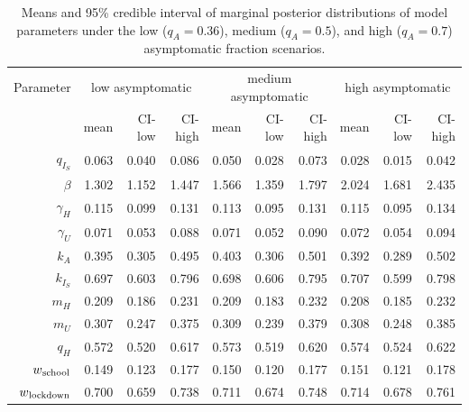 \documentclass[11pt]{article}
\begin{document}
\begin{table}[!htb]
	\centering
	\caption{Means and 95\% credible interval of marginal posterior distributions of model parameters under the low ($q_A = 0.36$), medium ($q_A = 0.5$), and high ($q_A = 0.7$) asymptomatic fraction scenarios.}
	\begin{tabular}{rrrrrrrrrr}
		\\\hline
		Parameter & \multicolumn{3}{c}{low asymptomatic} & \multicolumn{3}{c}{medium asymptomatic} & \multicolumn{3}{c}{high asymptomatic} \\
		{} & mean & CI-low & CI-high & mean & CI-low & CI-high & mean & CI-low & CI-high \\ 
		\hline
		$q_{I_S}$ & 0.063 & 0.040 & 0.086 & 0.050 & 0.028 & 0.073 & 0.028 & 0.015 & 0.042 \\ 
		$\beta$ & 1.302 & 1.152 & 1.447 & 1.566 & 1.359 & 1.797 & 2.024 & 1.681 & 2.435 \\ 
		$\gamma_H$ & 0.115 & 0.099 & 0.131 & 0.113 & 0.095 & 0.131 & 0.115 & 0.095 & 0.134 \\ 
		$\gamma_U$ & 0.071 & 0.053 & 0.088 & 0.071 & 0.052 & 0.090 & 0.072 & 0.054 & 0.094 \\ 
		$k_A$ & 0.395 & 0.305 & 0.495 & 0.403 & 0.306 & 0.501 & 0.392 & 0.289 & 0.502 \\ 
		$k_{I_S}$ & 0.697 & 0.603 & 0.796 & 0.698 & 0.606 & 0.795 & 0.707 & 0.599 & 0.798 \\ 
		$m_H$ & 0.209 & 0.186 & 0.231 & 0.209 & 0.183 & 0.232 & 0.208 & 0.185 & 0.232 \\ 
		$m_U$ & 0.307 & 0.247 & 0.375 & 0.309 & 0.239 & 0.379 & 0.308 & 0.248 & 0.385 \\ 
		$q_H$ & 0.572 & 0.520 & 0.617 & 0.573 & 0.519 & 0.620 & 0.574 & 0.524 & 0.622 \\ 
		$w\textsubscript{school}$ & 0.149 & 0.123 & 0.177 & 0.150 & 0.120 & 0.177 & 0.151 & 0.121 & 0.178 \\ 
		$w\textsubscript{lockdown}$ & 0.700 & 0.659 & 0.738 & 0.711 & 0.674 & 0.748 & 0.714 & 0.678 & 0.761 \\ 
		\hline
	\end{tabular}
	\label{tbl:posterior}
\end{table}


\end{document}
